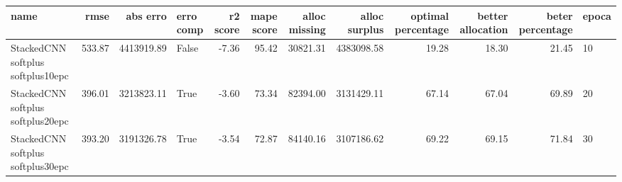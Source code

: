 \begin{tabular}{lrrlrrrrrrrl}
\toprule
name & rmse & abs erro & erro comp & r2 score & mape score & alloc missing & alloc surplus & optimal percentage & better allocation & beter percentage & epoca \\
\midrule
StackedCNN softplus softplus10epc & 533.87 & 4413919.89 & False & -7.36 & 95.42 & 30821.31 & 4383098.58 & 19.28 & 18.30 & 21.45 & 10 \\
StackedCNN softplus softplus20epc & 396.01 & 3213823.11 & True & -3.60 & 73.34 & 82394.00 & 3131429.11 & 67.14 & 67.04 & 69.89 & 20 \\
StackedCNN softplus softplus30epc & 393.20 & 3191326.78 & True & -3.54 & 72.87 & 84140.16 & 3107186.62 & 69.22 & 69.15 & 71.84 & 30 \\
\bottomrule
\end{tabular}
